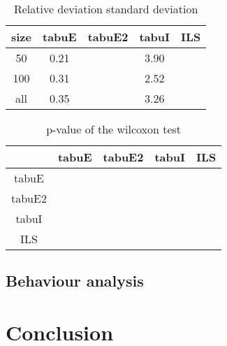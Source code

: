 \documentclass[12pt,a4paper]{article}
\begin{document}
\begin{table}[!h]
\centering
\begin{tabular}{|*{5}{c|}}
  \hline
  size & tabuE & tabuE2 & tabuI & ILS\\
  \hline
  50 & 0.21 &  & 3.90 &  \\ 
  100 & 0.31 &  & 2.52 &  \\
  all & 0.35 &  & 3.26  &  \\
  \hline
\end{tabular}
\caption{Relative deviation standard deviation}
\label{Relative deviation standard deviation}
\end{table}

\begin{table}[!h]
\centering
\begin{tabular}{|*{5}{c|}}
  \hline
  ~ & tabuE & tabuE2 & tabuI & ILS\\
  \hline
   tabuE &  &  &  &  \\ 
   tabuE2 &  &  &  &  \\
   tabuI &  &  &  &  \\
   ILS &  &  &  &  \\
  \hline
\end{tabular}
\caption{p-value of the wilcoxon test}
\label{p-value of the wilcoxon test}
\end{table}


\subsection{Behaviour analysis}


\section*{Conclusion}




\end{document}
